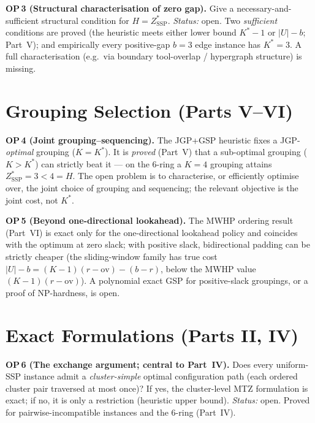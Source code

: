 \documentclass[11pt,a4paper]{article}
\newcommand{\ZSSP}{Z_{\mathrm{SSP}}^{*}}
\newcommand{\Kstar}{K^{*}}
\begin{document}
\begin{op}
\textbf{OP\,3 (Structural characterisation of zero gap).} Give a necessary-and-sufficient
structural condition for $H=\ZSSP$. \emph{Status:} open. Two \emph{sufficient} conditions
are proved (the heuristic meets either lower bound $\Kstar-1$ or $|U|-b$; Part~V); and
empirically every positive-gap $b=3$ edge instance has $\Kstar=3$. A full characterisation
(e.g.\ via boundary tool-overlap / hypergraph structure) is missing.
\end{op}

\section{Grouping Selection (Parts V--VI)}

\begin{op}
\textbf{OP\,4 (Joint grouping--sequencing).} The JGP+GSP heuristic fixes a JGP-\emph{optimal}
grouping ($K=\Kstar$). It is \emph{proved} (Part~V) that a sub-optimal grouping ($K>\Kstar$)
can strictly beat it --- on the $6$-ring a $K=4$ grouping attains $\ZSSP=3<4=H$. The open
problem is to characterise, or efficiently optimise over, the joint choice of grouping and
sequencing; the relevant objective is the joint cost, not $\Kstar$.
\end{op}

\begin{op}
\textbf{OP\,5 (Beyond one-directional lookahead).} The MWHP ordering result (Part~VI) is
exact only for the one-directional lookahead policy and coincides with the optimum at zero
slack; with positive slack, bidirectional padding can be strictly cheaper (the
sliding-window family has true cost $|U|-b=(K{-}1)(r{-}\mathrm{ov})-(b{-}r)$, below the MWHP
value $(K{-}1)(r{-}\mathrm{ov})$). A polynomial exact GSP for positive-slack groupings, or a
proof of NP-hardness, is open.
\end{op}

\section{Exact Formulations (Parts II, IV)}

\begin{op}
\textbf{OP\,6 (The exchange argument; central to Part~IV).} Does every uniform-SSP instance
admit a \emph{cluster-simple} optimal configuration path (each ordered cluster pair traversed
at most once)? If yes, the cluster-level MTZ formulation is exact; if no, it is only a
restriction (heuristic upper bound). \emph{Status:} open. Proved for pairwise-incompatible
instances and the $6$-ring (Part~IV).
\end{op}
\end{document}
